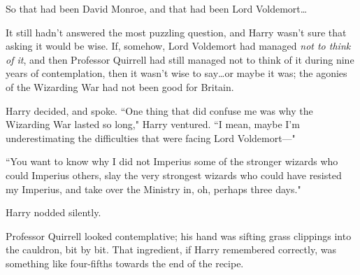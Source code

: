 So that had been David Monroe, and that had been Lord Voldemort…

It still hadn't answered the most puzzling question, and Harry wasn't sure that asking it would be wise. If, somehow, Lord Voldemort had managed \emph{not to think of it}, and then Professor Quirrell had still managed not to think of it during nine years of contemplation, then it wasn't wise to say…or maybe it was; the agonies of the Wizarding War had not been good for Britain.

Harry decided, and spoke. ``One thing that did confuse me was why the Wizarding War lasted so long," Harry ventured. ``I mean, maybe I'm underestimating the difficulties that were facing Lord Voldemort—"

``You want to know why I did not Imperius some of the stronger wizards who could Imperius others, slay the very strongest wizards who could have resisted my Imperius, and take over the Ministry in, oh, perhaps three days."

Harry nodded silently.

Professor Quirrell looked contemplative; his hand was sifting grass clippings into the cauldron, bit by bit. That ingredient, if Harry remembered correctly, was something like four-fifths towards the end of the recipe.

